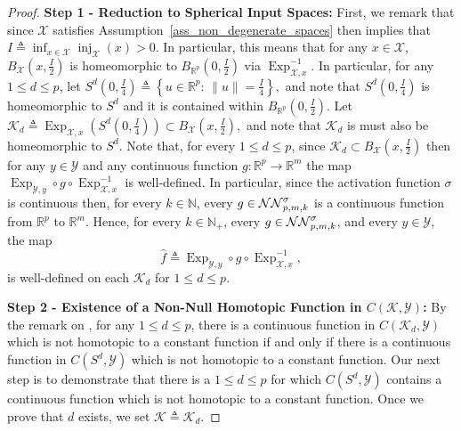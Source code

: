 \documentclass[anon,12pt]{colt2021} %
\newcommand{\rr}{{\mathbb{R}}}
\newcommand{\rrflex}[1]{{\ensuremath{\rr^{#1}
}}}
\newcommand{\xxx}{\mathcal{X}}
\newcommand{\yyy}{\mathcal{Y}}
\newcommand{\nn}{{\mathbb{N}}}
\newcommand{\kkk}{{\mathscr{K}}}
\begin{document}
\begin{proof}
\textbf{Step 1 - Reduction to Spherical Input Spaces:} 
First, we remark that since $\xxx$ satisfies Assumption~\ref{ass_non_degenerate_spaces} then \citep[Theorem 4.7]{CheegerGromovTaylorTheorem1982} implies that $I\triangleq \inf_{x \in \xxx}\operatorname{inj}_{\xxx}(x)>0$.  In particular, this means that for any $x \in \xxx$, $B_{\xxx}\left(x,\frac{I}{2}\right)$ is homeomorphic to $B_{\rrflex{p}}
\left(
0,\frac{I}{2}
\right)
$
via $\operatorname{Exp}_{\xxx,x}^{-1}$.  In particular, for any $1\leq d\leq p$, let $S^d\left(
0,\frac{I}{4}
\right)\triangleq 
\left\{
u \in \rrflex{p}:\,
\|u\|=\frac{I}{4}
\right\}
,
$ and note that $S^d\left(
0,\frac{I}{4}
\right)$ is homeomorphic to $S^d$ and it is contained within $B_{\rrflex{p}}
\left(
0,\frac{I}{2}
\right)
.
$
Let $\kkk_d\triangleq \operatorname{Exp}_{\xxx,x}\left(
S^d\left(
0,\frac{I}{4}
\right)
\right)\subset 
B_{\xxx}\left(x,\frac{I}{2}\right)
,
$ and note that $\kkk_d$ is must also be homeomorphic to $S^d$.  Note that, for every $1\leq d\leq p$, since $\kkk_d\subset B_{\xxx}\left(
x,\frac{I}{2}
\right)$ then for any $y \in \yyy$ and any continuous function $g:\rrflex{p}\rightarrow \rrflex{m}$ the map $\operatorname{Exp}_{\yyy,y}\circ g\circ \operatorname{Exp}_{\xxx,x}^{-1}$ is well-defined.  
In particular, since the activation function $\sigma$ is continuous then, for every $k\in \nn$, every $g \in \NN[p,m,k]$ is a continuous function from $\rrflex{p}$ to $\rrflex{m}$.  Hence, for every $k\in\nn_+$, every $g \in \NN[p,m,k]$, and every $y \in \yyy$, the map 
\begin{equation}
    \hat{f}\triangleq \operatorname{Exp}_{\yyy,y}\circ g\circ \operatorname{Exp}_{\xxx,x}^{-1}
    \label{eq_definition_hat_f_for_proof}
    ,
\end{equation}
is well-defined on each $\kkk_d$ for $1\leq d\leq p$.  


\textbf{Step 2 - Existence of a Non-Null Homotopic Function in $C(\kkk,\yyy)$:}
By the remark on \citep[page 26]{FuchsFomenkoHomotopicalTopology2016Edition2}, for any $1\leq d\leq p$, there is a continuous function in $C(\kkk_d,\yyy)$ which is not homotopic to a constant function if and only if there is a continuous function in $C(S^d,\yyy)$ which is not homotopic to a constant function.  Our next step is to demonstrate that there is a $1\leq d\leq p$ for which $C(S^d,\yyy)$ contains a continuous function which is not homotopic to a constant function.  Once we prove that $d$ exists, we set $\kkk\triangleq \kkk_d$. 
%



\end{proof}
\end{document}
